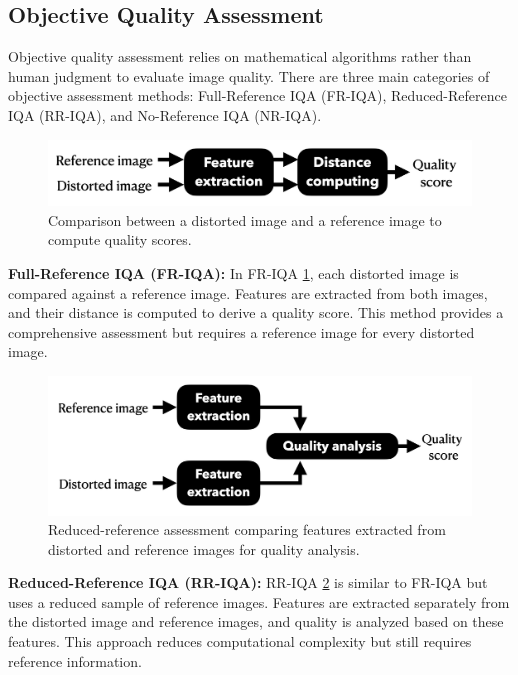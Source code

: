 \subsection{Objective Quality Assessment}
\label{sub:ObjectiveQualityAssessment}
Objective quality assessment relies on mathematical algorithms rather than human judgment to evaluate image quality. There are three main categories of objective assessment methods: Full-Reference IQA (FR-IQA), Reduced-Reference IQA (RR-IQA), and No-Reference IQA (NR-IQA). \par
\vspace{\baselineskip}
\begin{figure}[ht]
    \centering
    \includegraphics[keepaspectratio,width=15cm]{img/FRIQA.png}
    \caption{Comparison between a distorted image and a reference image to compute quality scores.}
    \label{fig:FRIQA}
\end{figure}
\noindent
\textbf{Full-Reference IQA (FR-IQA):} In FR-IQA \ref{fig:FRIQA}, each distorted image is compared against a reference image. Features are extracted from both images, and their distance is computed to derive a quality score. This method provides a comprehensive assessment but requires a reference image for every distorted image. \par
\vspace{\baselineskip}
\begin{figure}[ht]
    \centering
    \includegraphics[keepaspectratio,width=15cm]{img/RRIQA.png}
    \caption{Reduced-reference assessment comparing features extracted from distorted and reference images for quality analysis.}
    \label{fig:RRIQA}
\end{figure}
\noindent
\textbf{Reduced-Reference IQA (RR-IQA):} RR-IQA \ref{fig:RRIQA} is similar to FR-IQA but uses a reduced sample of reference images. Features are extracted separately from the distorted image and reference images, and quality is analyzed based on these features. This approach reduces computational complexity but still requires reference information. \par
